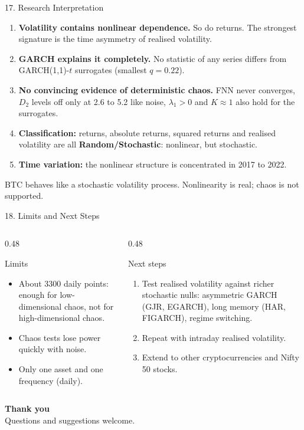 \documentclass[aspectratio=169,10pt]{beamer}
\newcommand{\takeaway}[1]{\vspace{2pt}\begin{exampleblock}{}\small #1\end{exampleblock}}
\begin{document}
\begin{frame}{17. Research Interpretation}
    \small
    \begin{enumerate}
        \item \textbf{Volatility contains nonlinear dependence.} So do returns. The strongest signature is the time asymmetry of realised volatility.
        \item \textbf{GARCH explains it completely.} No statistic of any series differs from GARCH(1,1)-$t$ surrogates (smallest $q = 0.22$).
        \item \textbf{No convincing evidence of deterministic chaos.} FNN never converges, $D_2$ levels off only at 2.6 to 5.2 like noise, $\lambda_1>0$ and $K\approx1$ also hold for the surrogates.
        \item \textbf{Classification:} returns, absolute returns, squared returns and realised volatility are all \textbf{Random/Stochastic}: nonlinear, but stochastic.
        \item \textbf{Time variation:} the nonlinear structure is concentrated in 2017 to 2022.
    \end{enumerate}
    \takeaway{BTC behaves like a stochastic volatility process. Nonlinearity is real; chaos is not supported.}
\end{frame}

\begin{frame}{18. Limits and Next Steps}
    \begin{columns}[T]
        \begin{column}{0.48\textwidth}
            \begin{alertblock}{Limits}
                \small
                \begin{itemize}
                    \item About 3300 daily points: enough for low-dimensional chaos, not for high-dimensional chaos.
                    \item Chaos tests lose power quickly with noise.
                    \item Only one asset and one frequency (daily).
                \end{itemize}
            \end{alertblock}
        \end{column}
        \begin{column}{0.48\textwidth}
            \begin{block}{Next steps}
                \small
                \begin{enumerate}
                    \item Test realised volatility against richer stochastic nulls: asymmetric GARCH (GJR, EGARCH), long memory (HAR, FIGARCH), regime switching.
                    \item Repeat with intraday realised volatility.
                    \item Extend to other cryptocurrencies and Nifty 50 stocks.
                \end{enumerate}
            \end{block}
        \end{column}
    \end{columns}
\end{frame}

\begin{frame}
    \centering
    \vspace{2cm}
    {\Large \textbf{Thank you}}\\[10pt]
    Questions and suggestions welcome.
\end{frame}
\end{document}
